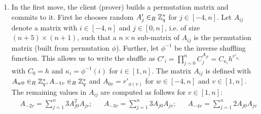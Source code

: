 \begin{enumerate}
  \item %
    In the first move, the client (prover) builds a permutation matrix and commits to it.
    First he chooses random $A'_j\in_R\mathbb{Z}^\ast_q$ for $j\in[-4,n]$.
    Let $A_{ij}$ denote a matrix with $i\in[-4,n]$ and $j\in[0,n]$, i.e. of size $(n+5)\times (n+1)$, such that a $n\times n$ sub-matrix of $A_{ij}$ is the permutation matrix (built from permutation $\phi$).
    Further, let $\phi^{-1}$ be the inverse shuffling function.
    This allows us to write the shuffle as $C'_{i}=\prod_{j=0}^{n}C_{j}^{A_{ji}}=C_{\kappa_i}h^{r'_{\kappa_i}}$ with $C_0=h$ and $\kappa_i=\phi^{-1}(i)$ for $i\in[1,n]$.
    The matrix $A_{ij}$ is defined with $A_{w0}\in_R\mathbb{Z}^\ast_q, A_{-1v}\in_R\mathbb{Z}^\ast_q$ and $A_{0v}=r'_{\phi(v)}$ for $w\in[-4,n]$ and $v\in[1,n]$.
    The remaining values in $A_{ij}$ are computed as follows for $v\in[1,n]$:
    \begin{align*}      
    & A_{-2v}=\sum_{j=1}^{n} 3A_{j0}^2 A_{jv}; && A_{-3v}=\sum_{j=1}^{n} 3A_{j0} A_{jv}; && A_{-4v}=\sum_{j=1}^{n} 2A_{j0} A_{jv}
    \end{align*}



\end{enumerate}
